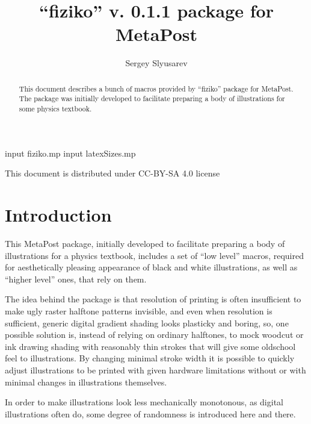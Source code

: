 \documentclass{article}
\author{Sergey Slyusarev}
\title{``fiziko'' v. 0.1.1 package for MetaPost }
\begin{document}
\begin{empfile}

\begin{empcmds}
input fiziko.mp
input latexSizes.mp
\end{empcmds}

\maketitle

\begin{abstract}
This document describes a bunch of macros provided by ``fiziko'' package for MetaPost. The package was initially developed to facilitate preparing a body of illustrations for some physics textbook. 
\end{abstract}

\begin{centering}

This document is distributed under CC-BY-SA 4.0 license 

\cc\bysa

\end{centering}

\tableofcontents

\section{Introduction}
This MetaPost package, initially developed to facilitate preparing a body of illustrations for a physics textbook, includes a set of ``low level'' macros, required for aesthetically pleasing appearance of black and white illustrations, as well as ``higher level'' ones, that rely on them.

The idea behind the package is that resolution of printing is often insufficient to make ugly raster halftone patterns invisible, and even when resolution is sufficient, generic digital gradient shading looks plasticky and boring, so, one possible solution is, instead of relying on ordinary halftones, to mock woodcut or ink drawing shading with reasonably thin strokes that will give some oldschool feel to illustrations. By changing minimal stroke width it is possible to quickly adjust illustrations to be printed with given hardware limitations without or with minimal changes in illustrations themselves. 

In order to make illustrations look less mechanically monotonous, as digital illustrations often do, some degree of randomness is introduced here and there.


\end{empfile}
\end{document}
